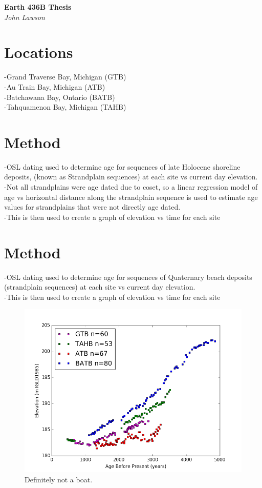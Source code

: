 \documentclass{article}
\begin{document}
\newpage
   \begin{center}
      \Large\textbf{Earth 436B Thesis}\\
      \large\textit{John Lawson}
   \end{center}

\newpage
\section{Locations}   
-Grand Traverse Bay, Michigan (GTB)\\
-Au Train Bay, Michigan (ATB)\\
-Batchawana Bay, Ontario (BATB)\\
-Tahquamenon Bay, Michigan (TAHB)\\
\newpage
\section{Method}
-OSL dating used to determine age for sequences of late Holocene shoreline
deposits, (known as Strandplain sequences) at each site vs current day elevation.\\
-Not all strandplains were age dated due to coset, so a linear regression model of age vs horizontal distance along the strandplain sequence is used to estimate age values for strandplains that were not directly age dated.\\
-This is then used to create a graph of elevation vs time for each site\\
\newpage
\section[2]{Method}
-OSL dating used to determine age for sequences of Quaternary beach deposits (strandplain sequences) at each site vs current day elevation.\\
-This is then used to create a graph of elevation vs time for each site\\
\begin{figure}[h]
	\includegraphics[width=\linewidth]{data/theDataRaw.png}
	\caption{Definitely not a boat.}
	\label{fig:rawData}
\end{figure}
\newpage
\end{document}
